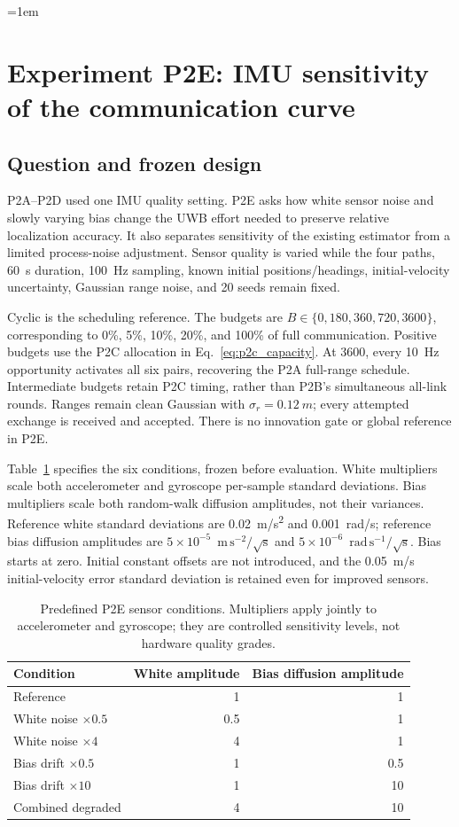 \clearpage
\begingroup
\emergencystretch=1em
\section{Experiment P2E: IMU sensitivity of the communication curve}
\label{sec:p2e}
\subsection{Question and frozen design}
P2A--P2D used one IMU quality setting. P2E asks how white sensor noise and slowly varying bias change the UWB effort needed to preserve relative localization accuracy. It also separates sensitivity of the existing estimator from a limited process-noise adjustment. Sensor quality is varied while the four paths, \SI{60}{s} duration, \SI{100}{Hz} sampling, known initial positions/headings, initial-velocity uncertainty, Gaussian range noise, and 20 seeds remain fixed.

Cyclic is the scheduling reference. The budgets are \(B\in\{0,180,360,720,3600\}\), corresponding to 0\%, 5\%, 10\%, 20\%, and 100\% of full communication. Positive budgets use the P2C allocation in Eq.~\ref{eq:p2c_capacity}. At 3600, every \SI{10}{Hz} opportunity activates all six pairs, recovering the P2A full-range schedule. Intermediate budgets retain P2C timing, rather than P2B's simultaneous all-link rounds. Ranges remain clean Gaussian with \(\sigma_r=\SI{0.12}{m}\); every attempted exchange is received and accepted. There is no innovation gate or global reference in P2E.

Table~\ref{tab:p2e_conditions} specifies the six conditions, frozen before evaluation. White multipliers scale both accelerometer and gyroscope per-sample standard deviations. Bias multipliers scale both random-walk diffusion amplitudes, not their variances. Reference white standard deviations are \SI{0.02}{m/s^2} and \SI{0.001}{rad/s}; reference bias diffusion amplitudes are \(5\times10^{-5}\)~\(\mathrm{m\,s^{-2}/\sqrt{s}}\) and \(5\times10^{-6}\)~\(\mathrm{rad\,s^{-1}/\sqrt{s}}\). Bias starts at zero. Initial constant offsets are not introduced, and the \SI{0.05}{m/s} initial-velocity error standard deviation is retained even for improved sensors.
\begin{table}[htbp]
\centering
\caption{Predefined P2E sensor conditions. Multipliers apply jointly to accelerometer and gyroscope; they are controlled sensitivity levels, not hardware quality grades.}
\label{tab:p2e_conditions}
\begin{tabular}{lrr}
\toprule
Condition & White amplitude & Bias diffusion amplitude \\
\midrule
Reference & 1 & 1 \\
White noise $\times0.5$ & 0.5 & 1 \\
White noise $\times4$ & 4 & 1 \\
Bias drift $\times0.5$ & 1 & 0.5 \\
Bias drift $\times10$ & 1 & 10 \\
Combined degraded & 4 & 10 \\
\bottomrule
\end{tabular}
\end{table}

